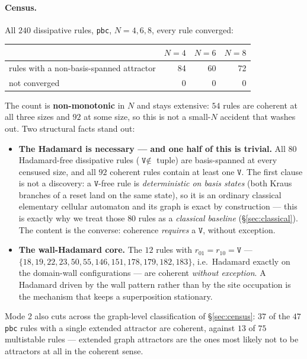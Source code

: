 \documentclass[11pt]{article}
\newcommand{\rt}[1]{\texttt{#1}}
\begin{document}
\paragraph{Census.} All $240$ dissipative rules, \rt{pbc}, $N=4,6,8$, every rule
converged:
\begin{center}\small
\begin{tabular}{@{}lrrr@{}}
\toprule
 & $N=4$ & $N=6$ & $N=8$ \\
\midrule
rules with a non-basis-spanned attractor & 84 & 60 & 72 \\
not converged & 0 & 0 & 0 \\
\bottomrule
\end{tabular}
\end{center}
The count is \textbf{non-monotonic} in $N$ and stays extensive: $54$ rules are
coherent at all three sizes and $92$ at some size, so this is not a small-$N$
accident that washes out. Two structural facts stand out:
\begin{itemize}
  \item \textbf{The Hadamard is necessary --- and one half of this is trivial.}
  All $80$ Hadamard-free dissipative rules ($\rt V\notin$ tuple) are basis-spanned
  at every censused size, and all $92$ coherent rules contain at least one $\rt V$.
  The first clause is not a discovery: a $\rt V$-free rule is \emph{deterministic
  on basis states} (both Kraus branches of a reset land on the same state), so it
  is an ordinary classical elementary cellular automaton and its graph is exact
  by construction --- this is exactly why we treat those $80$ rules as a
  \emph{classical baseline} (\S\ref{sec:classical}). The content is the converse:
  coherence \emph{requires} a $\rt V$, without exception.
  \item \textbf{The wall-Hadamard core.} The $12$ rules with $r_{01}=r_{10}=\rt V$
  --- $\{18,19,22,23,50,55,146,151,178,179,182,183\}$, i.e.\ Hadamard exactly on
  the domain-wall configurations --- are coherent \emph{without exception}. A
  Hadamard driven by the wall pattern rather than by the site occupation is the
  mechanism that keeps a superposition stationary.
\end{itemize}
Mode 2 also cuts across the graph-level classification of \S\ref{sec:census}:
$37$ of the $47$ \rt{pbc} rules with a single extended attractor are coherent,
against $13$ of $75$ multistable rules --- extended graph attractors are the ones
most likely not to be attractors at all in the coherent sense.

\begin{table}[h]\centering\small
\caption{Mode-1 (leakage) test (pbc, $N=4$): leaked weight is the population of
$\Phi^{400}(\mathbb{1}/d)$ remaining on graph-transient states. Non-zero leak
means the graph misplaces the coherent attractor.}
\label{tab:faithful}\end{table}
\end{document}
